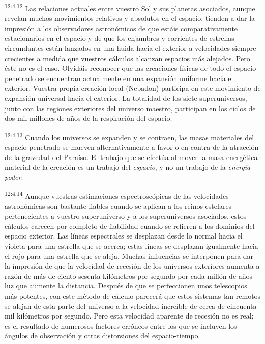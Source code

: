 \par
\textsuperscript{12:4.12} Las relaciones actuales entre vuestro Sol y sus planetas asociados, aunque revelan muchos movimientos relativos y absolutos en el espacio, tienden a dar la impresión a los observadores astronómicos de que estáis comparativamente estacionarios en el espacio y de que los enjambres y corrientes de estrellas circundantes están lanzados en una huida hacia el exterior a velocidades siempre crecientes a medida que vuestros cálculos alcanzan espacios más alejados. Pero éste no es el caso. Olvidáis reconocer que las creaciones físicas de todo el espacio penetrado se encuentran actualmente en una expansión uniforme hacia el exterior. Vuestra propia creación local (Nebadon) participa en este movimiento de expansión universal hacia el exterior. La totalidad de los siete superuniversos, junto con las regiones exteriores del universo maestro, participan en los ciclos de dos mil millones de años de la respiración del espacio.

\par
\textsuperscript{12:4.13} Cuando los universos se expanden y se contraen, las masas materiales del espacio penetrado se mueven alternativamente a favor o en contra de la atracción de la gravedad del Paraíso. El trabajo que se efectúa al mover la masa energética material de la creación es un trabajo del \textit{espacio}, y no un trabajo de la \textit{energía-poder}.

\par
\textsuperscript{12:4.14} Aunque vuestras estimaciones espectroscópicas de las velocidades astronómicas son bastante fiables cuando se aplican a los reinos estelares pertenecientes a vuestro superuniverso y a los superuniversos asociados, estos cálculos carecen por completo de fiabilidad cuando se refieren a los dominios del espacio exterior. Las líneas espectrales se desplazan desde lo normal hacia el violeta para una estrella que se acerca; estas líneas se desplazan igualmente hacia el rojo para una estrella que se aleja. Muchas influencias se interponen para dar la impresión de que la velocidad de recesión de los universos exteriores aumenta a razón de más de ciento sesenta kilómetros por segundo por cada millón de años-luz que aumente la distancia. Después de que se perfeccionen unos telescopios más potentes, con este método de cálculo parecerá que estos sistemas tan remotos se alejan de esta parte del universo a la velocidad increíble de cerca de cincuenta mil kilómetros por segundo. Pero esta velocidad aparente de recesión no es real; es el resultado de numerosos factores erróneos entre los que se incluyen los ángulos de observación y otras distorsiones del espacio-tiempo.

